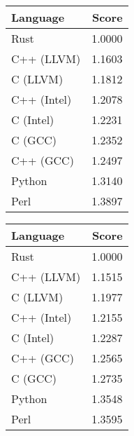 \begin{subtable}{0.33\textwidth}
    \centering
    \caption{$k=3$}
    \label{table:energy:dfa_gap(3)}
    \begin{tabular}{|l|r|}
        \hline
        Language & Score \\
        \hline
        Rust & 1.0000 \\
        C++ (LLVM) & 1.1603 \\
        C (LLVM) & 1.1812 \\
        C++ (Intel) & 1.2078 \\
        C (Intel) & 1.2231 \\
        C (GCC) & 1.2352 \\
        C++ (GCC) & 1.2497 \\
        Python & 1.3140 \\
        Perl & 1.3897 \\
        \hline
    \end{tabular}
\end{subtable}
\begin{subtable}{0.33\textwidth}
    \centering
    \caption{$k=4$}
    \label{table:energy:dfa_gap(4)}
    \begin{tabular}{|l|r|}
        \hline
        Language & Score \\
        \hline
        Rust & 1.0000 \\
        C++ (LLVM) & 1.1515 \\
        C (LLVM) & 1.1977 \\
        C++ (Intel) & 1.2155 \\
        C (Intel) & 1.2287 \\
        C++ (GCC) & 1.2565 \\
        C (GCC) & 1.2735 \\
        Python & 1.3548 \\
        Perl & 1.3595 \\
        \hline
    \end{tabular}
\end{subtable}%
